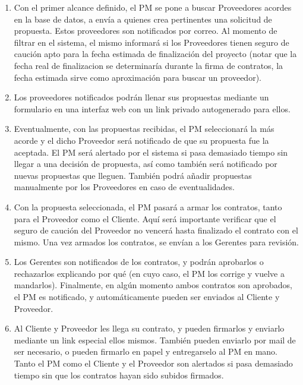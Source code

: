 \begin{enumerate}
    \item Con el primer alcance definido, el PM se pone a buscar Proveedores 
    acordes en la base de datos, a envía a quienes crea pertinentes una solicitud 
    de propuesta. Estos proveedores son notificados por correo. Al momento de filtrar 
    en el sistema, el mismo informará si los Proveedores tienen seguro de caución apto 
    para la fecha estimada de finalización del proyecto (notar que la fecha real de 
    finalizacion se determinaría durante la firma de contratos, la fecha estimada 
    sirve como aproximación para buscar un proveedor).
    
    \item Los proveedores notificados podrán llenar sus propuestas mediante un 
    formulario en una interfaz web con un link privado autogenerado para ellos. 
    
    \item Eventualmente, con las propuestas recibidas, el PM seleccionará la más acorde 
    y el dicho Proveedor será notificado de que su propuesta fue la aceptada. 
    El PM será alertado por el sistema si pasa demasiado tiempo sin llegar a una 
    decisión de propuesta, así como también será notificado por nuevas propuestas 
    que lleguen. También podrá añadir propuestas manualmente por los Proveedores en 
    caso de eventualidades. 
    
    \item Con la propuesta seleccionada, el PM pasará a armar los contratos, 
    tanto para el Proveedor como el Cliente. Aquí será importante verificar que 
    el seguro de caución del Proveedor no vencerá hasta finalizado el contrato con 
    el mismo. Una vez armados los contratos, se envían a los Gerentes para revisión. 
    
    \item Los Gerentes son notificados de los contratos, y podrán aprobarlos o 
    rechazarlos explicando por qué (en cuyo caso, el PM los corrige y vuelve a mandarlos). 
    Finalmente, en algún momento ambos contratos son aprobados, el PM es notificado, 
    y automáticamente pueden ser enviados al Cliente y Proveedor. 
    
    \item Al Cliente y Proveedor les llega su contrato, y pueden firmarlos y enviarlo 
    mediante un link especial ellos mismos. También pueden enviarlo por mail de ser 
    necesario, o pueden firmarlo en papel y entregarselo al PM en mano. 
    Tanto el PM como el Cliente y el Proveedor son alertados si pasa demasiado tiempo 
    sin que los contratos hayan sido subidos firmados. 
    

\end{enumerate}
